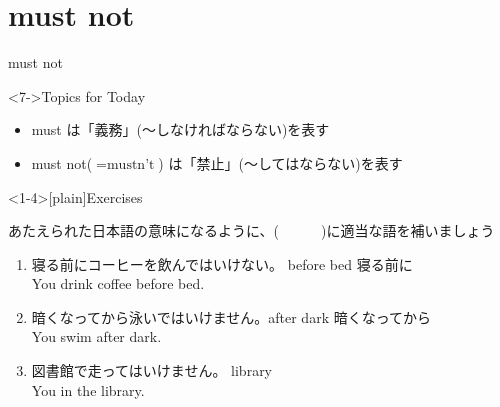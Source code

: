 \documentclass[aspectratio=169,xcolor={dvipsnames,table}]{beamer}
\newcommand{\myaudio}[1]{\href{#1}{\faVolumeUp}}
\begin{document}
\section{must not}
\begin{frame}[plain]{must not}
 
\Large


\vspace{-10pt}
\mbox{}\hfill{}



 \hfill{}

\hfill{{\scriptsize \myaudio{./audio/013_must_04.mp3}}}

\vfill

\begin{exampleblock}<7->{Topics for Today}
\begin{itemize}[square]\small
 \item must は「義務」(〜しなければならない)を表す
 \item must not($=\text{mustn't}$) は「禁止」(〜してはならない)を表す
 \end{itemize}
     \end{exampleblock}

\end{frame}
\begin{frame}<1-4>[plain]{Exercises}
 
あたえられた日本語の意味になるように、(~~~~~~)に適当な語を補いましょう
\hfill{\myaudio{./audio/013_must_05.mp3}}


\begin{enumerate}
 \item {\small 寝る前にコーヒーを飲んではいけない。}%
\hfill{}{\scriptsize before bed 寝る前に}\\
You  drink coffee before bed.
 \item {\small 暗くなってから泳いではいけません。}\hfill{}{\scriptsize after dark 暗くなってから}\\
 You  swim after dark.
 \item {\small 図書館で走ってはいけません。}%
\hfill{}{\scriptsize library }\\
 You   in the library.
\end{enumerate}
\end{frame}
\end{document}
